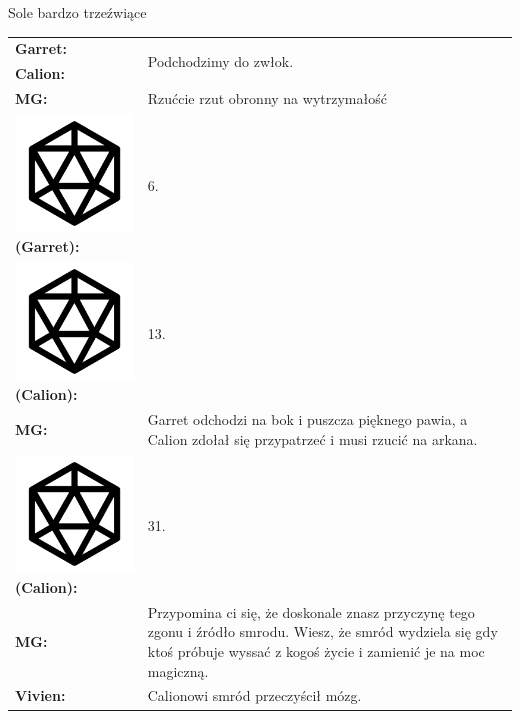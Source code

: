 \documentclass[10pt,twoside,twocolumn]{book}
\begin{document}
\begin{rpg-quotebox}{Sole bardzo trzeźwiące}
   \begin{tabularx}{\columnwidth}{lX}
      \textbf{Garret:} & \multirow{2}{*}{Podchodzimy do zwłok.}\\
      \textbf{Calion:} & \\
      \textbf{MG:} & Rzućcie rzut obronny na wytrzymałość\\
      \includegraphics[scale=0.06]{img/d20.png}\textbf{(Garret):}& 6.\\
      \includegraphics[scale=0.06]{img/d20.png}\textbf{(Calion):}& 13.\\
      \textbf{MG:} & Garret odchodzi na bok i puszcza pięknego pawia, a Calion zdołał się przypatrzeć i musi rzucić na arkana.\\
      \includegraphics[scale=0.06]{img/d20.png}\textbf{(Calion):}& 31.\\
      \textbf{MG:} & Przypomina ci się, że doskonale znasz przyczynę tego zgonu i źródło smrodu. Wiesz, że smród wydziela się gdy ktoś próbuje wyssać z kogoś życie i zamienić je na moc magiczną.\\
      \textbf{Vivien:} & Calionowi smród przeczyścił mózg.\\
   \end{tabularx}
\end{rpg-quotebox}
\end{document}
